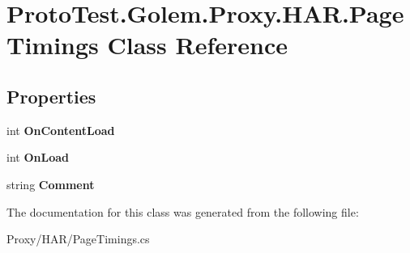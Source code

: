 \hypertarget{class_proto_test_1_1_golem_1_1_proxy_1_1_h_a_r_1_1_page_timings}{\section{Proto\-Test.\-Golem.\-Proxy.\-H\-A\-R.\-Page\-Timings Class Reference}
\label{class_proto_test_1_1_golem_1_1_proxy_1_1_h_a_r_1_1_page_timings}
}
\subsection*{Properties}
\begin{DoxyCompactItemize}
\item 
\hypertarget{class_proto_test_1_1_golem_1_1_proxy_1_1_h_a_r_1_1_page_timings_a0d9e1749e99de3964601e9872482af71}{int {\bfseries On\-Content\-Load}}\label{class_proto_test_1_1_golem_1_1_proxy_1_1_h_a_r_1_1_page_timings_a0d9e1749e99de3964601e9872482af71}

\item 
\hypertarget{class_proto_test_1_1_golem_1_1_proxy_1_1_h_a_r_1_1_page_timings_a912b9b42367bac350190b0db2763bda4}{int {\bfseries On\-Load}}\label{class_proto_test_1_1_golem_1_1_proxy_1_1_h_a_r_1_1_page_timings_a912b9b42367bac350190b0db2763bda4}

\item 
\hypertarget{class_proto_test_1_1_golem_1_1_proxy_1_1_h_a_r_1_1_page_timings_ab2448f111b8ec1597875f4d150cab865}{string {\bfseries Comment}}\label{class_proto_test_1_1_golem_1_1_proxy_1_1_h_a_r_1_1_page_timings_ab2448f111b8ec1597875f4d150cab865}

\end{DoxyCompactItemize}


The documentation for this class was generated from the following file\-:\begin{DoxyCompactItemize}
\item 
Proxy/\-H\-A\-R/Page\-Timings.\-cs\end{DoxyCompactItemize}
